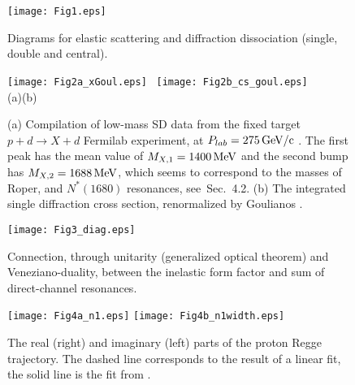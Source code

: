 \documentclass[12pt]{article}
\begin{document}
\begin{figure}[p] %
\texttt{[image: Fig1.eps]}
\caption{Diagrams for elastic scattering and diffraction dissociation (single, double and central).} \label{fig:FeynmanDiagrams}
\end{figure}
\begin{figure}[p] %
\texttt{[image: Fig2a\_xGoul.eps]}%
~\texttt{[image: Fig2b\_cs\_goul.eps]} \\
  {\hspace{1.5cm} (a)\hspace{0.4\linewidth}(b)}
  \vspace{-0.5cm}
   \caption{(a) Compilation of low-mass SD data from the fixed target $p+d\rightarrow X+d$ Fermilab experiment, at $P_{lab}=275 \mbox{\,GeV/c}$ \cite{Goulianos}. The first peak has the mean value of $M_{X,1}=1400 \mbox{\,MeV}$ and the second bump has $M_{X,2}=1688 \mbox{\,MeV}$, which seems to correspond to the masses of Roper, and $N^*(1680)$ resonances,  see~Sec.~4.2. %
   (b) The integrated single diffraction cross section, renormalized by Goulianos \cite{GoulPlots}.}
   \label{fig1}
  \vspace{-0.5cm} 
\end{figure}
\newpage
\begin{figure}[p] %
 \hspace{1cm} \texttt{[image: Fig3\_diag.eps]}
 \caption{Connection, through unitarity (generalized optical
 theorem) and Veneziano-duality, between the inelastic form factor
 and sum of direct-channel resonances.} \label{fig:Regge-dual}
\end{figure}
\begin{figure}[p] %
\texttt{[image: Fig4a\_n1.eps]}%
\texttt{[image: Fig4b\_n1width.eps]}
\caption{The real (right) and imaginary (left) parts of the proton Regge trajectory. The dashed line corresponds to the result of a linear fit, the solid line is the
fit from \cite{Paccanoni}. \label{fig:n1}}
\end{figure}
\newpage
\end{document}
